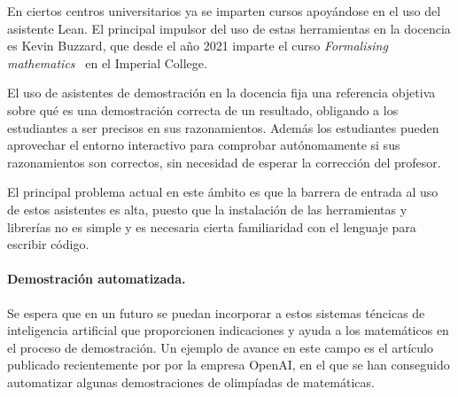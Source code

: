 En ciertos centros universitarios ya se imparten cursos apoyándose en el uso del
asistente Lean. El principal impulsor del uso de estas herramientas en la
docencia es Kevin Buzzard, que desde el año 2021 imparte el curso
\textit{Formalising mathematics}~\cite{buzzardFormalisingMathematicsFormalising}
en el Imperial College.

El uso de asistentes de demostración en la docencia fija una referencia objetiva
sobre qué es una demostración correcta de un resultado, obligando a los
estudiantes a ser precisos en sus razonamientos. Además los estudiantes pueden
aprovechar el entorno interactivo para comprobar autónomamente si sus
razonamientos son correctos, sin necesidad de esperar la corrección del
profesor.

El principal problema actual en este ámbito es que la barrera de entrada al uso
de estos asistentes es alta, puesto que la instalación de las herramientas y
librerías no es simple y es necesaria cierta familiaridad con el lenguaje para
escribir código.

\paragraph{Demostración automatizada.} Se espera que en un futuro se puedan
incorporar a estos sistemas téncicas de inteligencia artificial que proporcionen
indicaciones y ayuda a los matemáticos en el proceso de demostración. Un ejemplo
de avance en este campo es el artículo~\cite{poluSolvingFormalMath} publicado recientemente por por la
empresa OpenAI, en el que se han conseguido automatizar algunas demostraciones de
olimpíadas de matemáticas.



